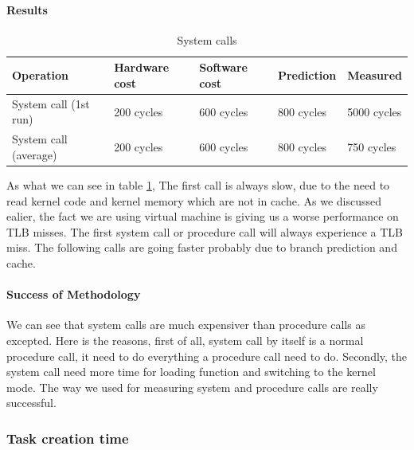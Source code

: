 \paragraph{Results}
\begin{table} [h]
\begin{center}
\begin{tabular}{| l | l | l | l | l |}
\hline
Operation 				& Hardware cost & Software cost & Prediction & Measured \\
\hline
System call (1st run) & 200 cycles & 600 cycles & 800 cycles & 5000 cycles\\
\hline
System call (average) & 200 cycles & 600 cycles & 800 cycles & 750 cycles\\
\hline
\end{tabular}
\end{center}

\caption{System calls\label {tab:sysCall}}
\end{table}


As what we can see in table \ref{tab:sysCall}, The first call is always slow, due to the need to read kernel code and
kernel memory which are not in cache. As we discussed ealier, the fact we are using virtual machine is giving us a worse performance on TLB misses. The first system call or procedure call will always experience a TLB miss.
The following calls are going faster probably due to branch prediction and
cache.

\paragraph{Success of Methodology}
We can see that system calls are much expensiver than procedure calls as excepted. Here is the reasons, first of all, system call by itself is a normal procedure call, it need to do everything a procedure call need to do. Secondly, the system call need more time for loading function and switching to the kernel mode. The way we used for measuring system and procedure calls are really successful.

\subsubsection{Task creation time}
